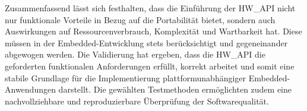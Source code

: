 \vspace{1cm}
Zusammenfassend lässt sich festhalten, dass die Einführung der HW\_API nicht nur funktionale Vorteile in Bezug auf die Portabilität bietet, sondern auch Auswirkungen auf Ressourcenverbrauch, Komplexität und Wartbarkeit hat. 
Diese müssen in der Embedded-Entwicklung stets berücksichtigt und gegeneinander abgewogen werden. 
Die Validierung hat ergeben, dass die HW\_API die geforderten funktionalen Anforderungen erfüllt, korrekt arbeitet und somit eine stabile Grundlage für die Implementierung plattformunabhängiger Embedded-Anwendungen darstellt. 
Die gewählten Testmethoden ermöglichten zudem eine nachvollziehbare und reproduzierbare Überprüfung der Softwarequalität.






























